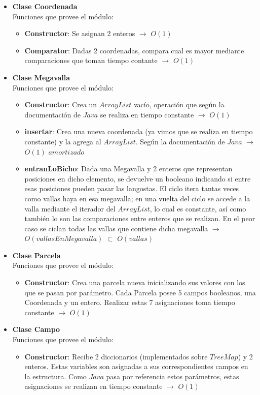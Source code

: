 \begin{itemize}
\item \textbf{Clase Coordenada}\\
\indent Funciones que provee el módulo:
\begin{itemize}
 \item \textbf{Constructor}: Se asignan 2 enteros $\rightarrow$ $O(1)$ 
 \item \textbf{Comparator}: Dadas 2 coordenadas, compara cual es mayor mediante
comparaciones que toman tiempo contante $\rightarrow$ $O(1)$ 
\end{itemize}

\item \textbf{Clase Megavalla}\\
\indent Funciones que provee el módulo:
\begin{itemize}
 \item \textbf{Constructor}: Crea un $ArrayList$ vacío, operación que según la documentación
de $Java$ se realiza en tiempo constante $\rightarrow$ $O(1)$ 
 \item \textbf{insertar}: Crea una nueva coordenada (ya vimos que se realiza
en tiempo constante) y la agrega al $ArrayList$. Según la documentación de
$Java$ $\rightarrow$ $O(1)$ $amortizado$
 \item \textbf{entranLoBicho}: Dada una Megavalla y 2 enteros que representan posiciones en dicho elemento, se devuelve un booleano indicando si entre esas posiciones pueden pasar las langostas. El ciclo itera tantas veces como vallas haya en esa megavalla; en una vuelta del ciclo se accede a la valla mediante el iterador del $ArrayList$, lo cual es constante, así como también lo son las comparaciones entre enteros que se realizan. En el peor caso se ciclan todas las vallas que contiene dicha megavalla  $\rightarrow$ $O(vallasEnMegavalla)$
$\subset$ $O(vallas)$ 
\end{itemize}

\item \textbf{Clase Parcela}\\
\indent Funciones que provee el módulo:
\begin{itemize}
 \item \textbf{Constructor}: Crea una parcela nueva inicializando sus valores
con los que se pasan por parámetro. Cada Parcela posee 5 campos booleanos, una
Coordenada y un entero. Realizar estas 7 asignaciones toma tiempo
constante $\rightarrow$ $O(1)$ 
\end{itemize}

\item \textbf{Clase Campo}\\
\indent Funciones que provee el módulo:
\begin{itemize}
 \item \textbf{Constructor}: Recibe 2 diccionarios (implementados sobre $TreeMap$) y 2
enteros. Estas variables son asignadas a sus correspondientes campos en la
estructura. Como $Java$ pasa por referencia estos parámetros, estas
asignaciones se realizan en tiempo constante $\rightarrow$ $O(1)$ 


\end{itemize}
\end{itemize}
